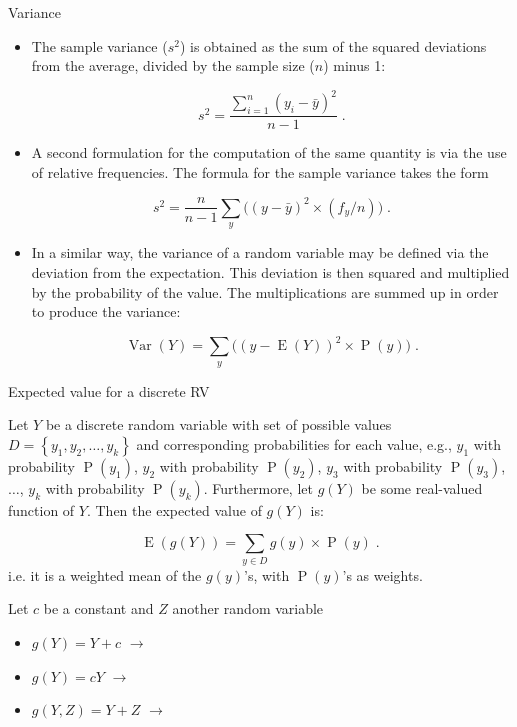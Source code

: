 \documentclass[10pt]{beamer}\usepackage[]{graphicx}\usepackage[]{color}
\newcommand{\Var}{\operatorname{Var}}
\newcommand{\Expec}{\operatorname{E}}
\newcommand{\Prob}{\operatorname{P}}
\begin{document}
\begin{frame}[fragile]{Variance}
	\small
	\begin{itemize}		
		
		\item The sample variance ($s^2$) is obtained as the sum of the squared
		deviations from the average, divided by the sample size ($n$) minus 1:
		
		$$s^2 = \frac{\sum_{i=1}^n (y_i - \bar y)^2}{n-1}\;.$$ 
		
		\item  A second	formulation for the computation of the same quantity is via the use of
		relative frequencies. The formula for the sample variance takes the form
		
		$$s^2 = \frac{n}{n-1}\sum_y \big((y - \bar y)^2\times (f_y/n)\big)\;.$$
		
		
		\item In a similar way, the variance of a random variable may be defined via
		the deviation from the expectation. This deviation is
		then squared and multiplied by the probability of the value. The
		multiplications are summed up in order to produce the variance:
		
		$$\Var(Y) = \sum_y\big( (y-\Expec(Y))^2 \times \Prob(y)\big)\;.$$
		
	\end{itemize}
	
\end{frame}


\begin{frame}{Expected value for a discrete RV}
	
	\begin{definition}
		Let $Y$ be a discrete random variable with set of possible values $D=\left\lbrace y_1, y_2, \ldots,y_k  \right\rbrace$ and corresponding probabilities for each value, e.g., $y_1$ with probability $\Prob(y_1)$, $y_2$ with probability $\Prob(y_2)$, $y_3$ with probability $\Prob(y_3)$, $\ldots$, $y_k$ with probability $\Prob(y_k)$. Furthermore, let $g(Y)$ be some real-valued function of $Y$. Then the expected value of $g(Y)$ is:
		
		$$\operatorname{E}(g(Y)) =  \sum_{y \in D} g(y) \times \operatorname{P}(y)\;.$$
		i.e. it is a weighted mean of the $g(y)$'s, with $\Prob(y)$'s as weights.
	\end{definition}
	\pause 
	Let $c$ be a constant and $Z$ another random variable
	\begin{itemize}
		\item $g(Y) = Y + c$ $\rightarrow$  
		\item $g(Y) = cY$ $\rightarrow$ 
		\item $g(Y,Z) = Y + Z$ $\rightarrow$ 
	\end{itemize}
	
\end{frame}
\end{document}
